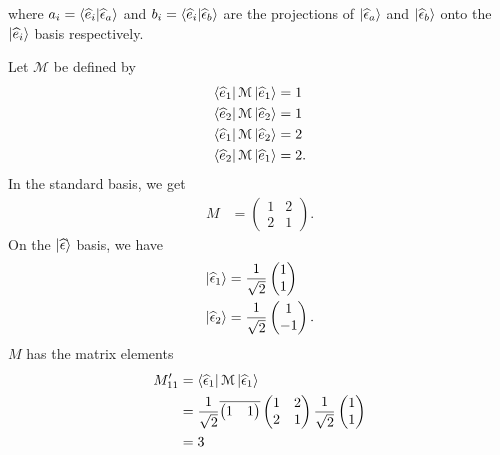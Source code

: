 \documentclass[10pt]{mypackage}
\begin{document}
where $a_i = \braket{\widehat{e}_i}{\widehat{\epsilon}_a}$ and $b_i = \braket{\widehat{e}_i}{\widehat{\epsilon}_b}$ are the projections of $\ket{\widehat{\epsilon}_{a}}$ and $\ket{\widehat{\epsilon}_b}$ onto the $\ket{\widehat{e}_i}$ basis respectively.
\begin{example}
  Let $\mathcal{M}$ be defined by
  \begin{align*}
    \bra{\widehat{e}_1}\mathcal{M}\ket{\widehat{e}_1} &= 1\\
    \bra{\widehat{e}_2}\mathcal{M}\ket{\widehat{e}_2} &= 1\\
    \bra{\widehat{e}_1}\mathcal{M}\ket{\widehat{e}_2} &= 2\\
    \bra{\widehat{e}_2}\mathcal{M}\ket{\widehat{e}_1} &= 2.
  \end{align*}
  In the standard basis, we get
  \begin{align*}
    M &= \begin{pmatrix}1 & 2 \\ 2 & 1\end{pmatrix}.
  \end{align*}
  On the $\ket{\widehat{\epsilon}}$ basis, we have
  \begin{align*}
    \ket{\widehat{\epsilon}_1} &= \frac{1}{\sqrt{2}} \begin{pmatrix}1\\1\end{pmatrix}\\
    \ket{\widehat{\epsilon}_2} &= \frac{1}{\sqrt{2}} \begin{pmatrix}1\\-1\end{pmatrix}.
  \end{align*}
  $M$ has the matrix elements
  \begin{align*}
    M_{11}' &= \bra{\widehat{\epsilon}_1}\mathcal{M}\ket{\widehat{\epsilon}_1}\\
            &= \frac{1}{\sqrt{2}} \overline{ \begin{pmatrix}1 & 1\end{pmatrix} } \begin{pmatrix}1 & 2 \\ 2 & 1\end{pmatrix} \frac{1}{\sqrt{2}} \begin{pmatrix}1\\1\end{pmatrix}\\
            &= 3\\
            \\

\end{align*}
\end{example}
\end{document}
